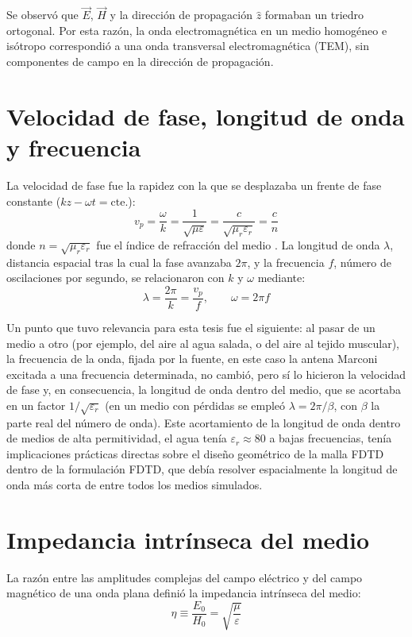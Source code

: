 Se observó que $\vec{E}$, $\vec{H}$ y la dirección de propagación $\hat{z}$ formaban un triedro ortogonal. Por esta razón, la onda electromagnética en un medio homogéneo e isótropo correspondió a una onda transversal electromagnética (TEM), sin componentes de campo en la dirección de propagación.

\section{Velocidad de fase, longitud de onda y frecuencia}
La velocidad de fase fue la rapidez con la que se desplazaba un frente de fase constante ($kz-\omega t = \text{cte.}$):
\begin{equation}
    v_p = \frac{\omega}{k} = \frac{1}{\sqrt{\mu\varepsilon}} = \frac{c}{\sqrt{\mu_r\varepsilon_r}} = \frac{c}{n}
\end{equation}
donde $n=\sqrt{\mu_r\varepsilon_r}$ fue el índice de refracción del medio \cite{ITU2025}. La longitud de onda $\lambda$, distancia espacial tras la cual la fase avanzaba $2\pi$, y la frecuencia $f$, número de oscilaciones por segundo, se relacionaron con $k$ y $\omega$ mediante:
\begin{equation}
    \lambda = \frac{2\pi}{k} = \frac{v_p}{f}, \qquad \omega = 2\pi f
\end{equation}

Un punto que tuvo relevancia para esta tesis fue el siguiente: al pasar de un medio a otro (por ejemplo, del aire al agua salada, o del aire al tejido muscular), la frecuencia de la onda, fijada por la fuente, en este caso la antena Marconi excitada a una frecuencia determinada, no cambió, pero sí lo hicieron la velocidad de fase y, en consecuencia, la longitud de onda dentro del medio, que se acortaba en un factor $1/\sqrt{\varepsilon_r}$ (en un medio con pérdidas se empleó $\lambda=2\pi/\beta$, con $\beta$ la parte real del número de onda). Este acortamiento de la longitud de onda dentro de medios de alta permitividad, el agua tenía $\varepsilon_r\approx 80$ a bajas frecuencias, tenía implicaciones prácticas directas sobre el diseño geométrico de la malla FDTD dentro de la formulación FDTD, que debía resolver espacialmente la longitud de onda más corta de entre todos los medios simulados.

\section{Impedancia intrínseca del medio}
La razón entre las amplitudes complejas del campo eléctrico y del campo magnético de una onda plana definió la impedancia intrínseca del medio:
\begin{equation}
    \eta \equiv \frac{E_0}{H_0} = \sqrt{\frac{\mu}{\varepsilon}}
\end{equation}

